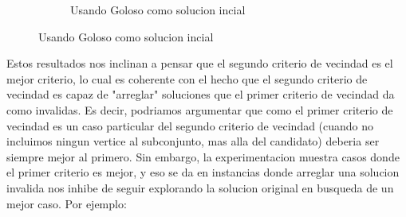 \begin{itemize}
\begin{figure}[H]
\begin{subfigure}[b]{0.5\textwidth}
                \caption{Usando Goloso como solucion incial}
        \end{subfigure}
        
\end{figure}
    

\end{itemize}



Estos resultados nos inclinan a pensar que el segundo criterio de vecindad es el mejor criterio, lo cual es coherente con el hecho que el segundo criterio de vecindad es capaz de "arreglar" soluciones que el primer criterio de vecindad da como invalidas. Es decir, podriamos argumentar que como el primer criterio de vecindad es un caso particular del segundo criterio de vecindad (cuando no incluimos ningun vertice al subconjunto, mas alla del candidato) deberia ser siempre mejor al primero. Sin embargo, la experimentacion muestra casos donde el primer criterio es mejor, y eso se da en instancias donde arreglar una solucion invalida nos inhibe de seguir explorando la solucion original en busqueda de un mejor caso. Por ejemplo:

